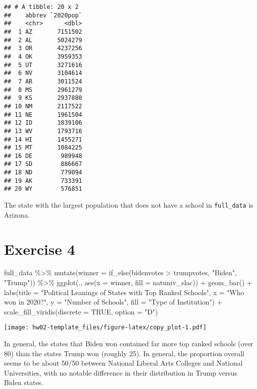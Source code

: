 \documentclass[
]{article}
\newenvironment{Shaded}{\begin{snugshade}}{\end{snugshade}}
\newcommand{\AttributeTok}[1]{\textcolor[rgb]{0.77,0.63,0.00}{#1}}
\newcommand{\ConstantTok}[1]{\textcolor[rgb]{0.00,0.00,0.00}{#1}}
\newcommand{\FunctionTok}[1]{\textcolor[rgb]{0.00,0.00,0.00}{#1}}
\newcommand{\NormalTok}[1]{#1}
\newcommand{\SpecialCharTok}[1]{\textcolor[rgb]{0.00,0.00,0.00}{#1}}
\newcommand{\StringTok}[1]{\textcolor[rgb]{0.31,0.60,0.02}{#1}}
\begin{document}
\begin{verbatim}
## # A tibble: 20 x 2
##    abbrev `2020pop`
##    <chr>      <dbl>
##  1 AZ       7151502
##  2 AL       5024279
##  3 OR       4237256
##  4 OK       3959353
##  5 UT       3271616
##  6 NV       3104614
##  7 AR       3011524
##  8 MS       2961279
##  9 KS       2937880
## 10 NM       2117522
## 11 NE       1961504
## 12 ID       1839106
## 13 WV       1793716
## 14 HI       1455271
## 15 MT       1084225
## 16 DE        989948
## 17 SD        886667
## 18 ND        779094
## 19 AK        733391
## 20 WY        576851
\end{verbatim}

The state with the largest population that does not have a school in
\texttt{full\_data} is Arizona.

\hypertarget{exercise-4}{%
\section{Exercise 4}\label{exercise-4}}

\begin{Shaded}
\begin{Highlighting}[]
\NormalTok{full\_data }\SpecialCharTok{\%\textgreater{}\%}
  \FunctionTok{mutate}\NormalTok{(}\AttributeTok{winner =} \FunctionTok{if\_else}\NormalTok{(bidenvotes }\SpecialCharTok{\textgreater{}}\NormalTok{ trumpvotes, }\StringTok{"Biden"}\NormalTok{, }\StringTok{"Trump"}\NormalTok{)) }\SpecialCharTok{\%\textgreater{}\%}
  \FunctionTok{ggplot}\NormalTok{(., }\FunctionTok{aes}\NormalTok{(}\AttributeTok{x =}\NormalTok{ winner, }\AttributeTok{fill =}\NormalTok{ natuniv\_slac)) }\SpecialCharTok{+}
  \FunctionTok{geom\_bar}\NormalTok{() }\SpecialCharTok{+}
  \FunctionTok{labs}\NormalTok{(}\AttributeTok{title =} \StringTok{"Political Leanings of States with Top Ranked Schools"}\NormalTok{,}
       \AttributeTok{x =} \StringTok{"Who won in 2020?"}\NormalTok{, }\AttributeTok{y =} \StringTok{"Number of Schools"}\NormalTok{,}
       \AttributeTok{fill =} \StringTok{"Type of Institution"}\NormalTok{) }\SpecialCharTok{+}
  \FunctionTok{scale\_fill\_viridis}\NormalTok{(}\AttributeTok{discrete =} \ConstantTok{TRUE}\NormalTok{, }\AttributeTok{option =} \StringTok{"D"}\NormalTok{)}
\end{Highlighting}
\end{Shaded}

\texttt{[image: hw02-template\_files/figure-latex/copy\_plot-1.pdf]}

In general, the states that Biden won contained far more top ranked
schools (over 80) than the states Trump won (roughly 25). In general,
the proportion overall seems to be about 50/50 between National Liberal
Arts Colleges and National Universities, with no notable difference in
their distribution in Trump versus Biden states.
\end{document}
